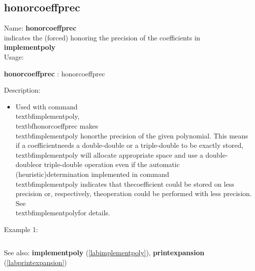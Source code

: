 \subsection{honorcoeffprec}
\label{labhonorcoeffprec}
\noindent Name: \textbf{honorcoeffprec}\\
indicates the (forced) honoring the precision of the coefficients in \textbf{implementpoly}\\
\noindent Usage: 
\begin{center}
\textbf{honorcoeffprec} : \textsf{honorcoeffprec}\\
\end{center}
\noindent Description: \begin{itemize}

\item Used with command \\textbf{implementpoly}, \\textbf{honorcoeffprec} makes \\textbf{implementpoly} honor\n   the precision of the given polynomial. This means if a coefficient\n   needs a double-double or a triple-double to be exactly stored,\n   \\textbf{implementpoly} will allocate appropriate space and use a double-double\n   or triple-double operation even if the automatic (heuristic)\n   determination implemented in command \\textbf{implementpoly} indicates that the\n   coefficient could be stored on less precision or, respectively, the\n   operation could be performed with less precision. See \\textbf{implementpoly}\n   for details.\n\end{itemize}
\noindent Example 1: 
\begin{center}\begin{minipage}{15cm}\begin{Verbatim}[frame=single]
\end{Verbatim}
\end{minipage}\end{center}
See also: \textbf{implementpoly} (\ref{labimplementpoly}), \textbf{printexpansion} (\ref{labprintexpansion})
